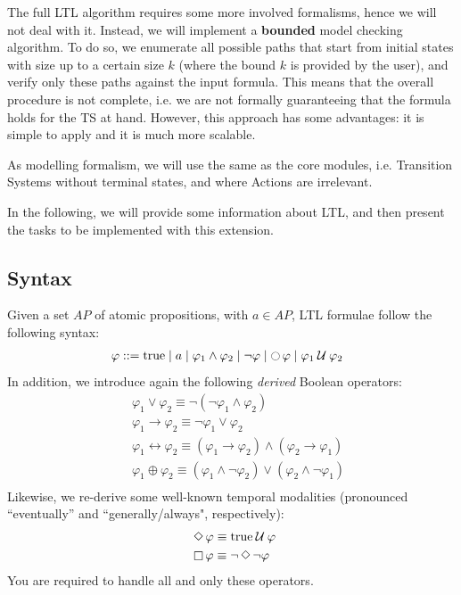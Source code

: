 \documentclass{article}
\begin{document}
The full LTL algorithm requires some more involved formalisms, hence we will not deal with it. Instead, we will implement a \textbf{bounded} model checking algorithm. To do so, we enumerate all possible paths that start from initial states with size up to a certain size $k$ (where the bound $k$ is provided by the user), and verify only these paths against the input formula. This means that the overall procedure is not complete, i.e. we are not formally guaranteeing that the formula holds for the TS at hand. However, this approach has some advantages: it is simple to apply and it is much more scalable. 

As modelling formalism, we will use the same as the core modules, i.e. Transition Systems without terminal states, and where Actions are irrelevant.

In the following, we will provide some information about LTL, and then present the tasks to be implemented with this extension.

\subsection*{Syntax}
Given a set $AP$ of atomic propositions, with $a \in AP$, LTL formulae follow the following syntax: 
\begin{align*}
    &\; \varphi ::= \text{true} \mid a \mid \varphi_1 \land \varphi_2 \mid \neg \varphi \mid \mathop{\ocircle}{\varphi} \mid \varphi_1 \mathbin{\mathcal{U}} \varphi_2
\end{align*}
In addition, we introduce again the following \emph{derived} Boolean operators: 
\begin{align*}
    &\; \varphi_1 \lor \varphi_2 \equiv \neg (\neg \varphi_1 \land \varphi_2) \\
    &\; \varphi_1 \rightarrow \varphi_2 \equiv \neg \varphi_1 \lor \varphi_2 \\
    &\; \varphi_1 \leftrightarrow  \varphi_2 \equiv (\varphi_1 \rightarrow \varphi_2) \land (\varphi_2 \rightarrow \varphi_1) \\
    &\; \varphi_1 \oplus  \varphi_2 \equiv (\varphi_1 \land \neg \varphi_2) \lor (\varphi_2 \land \neg \varphi_1)\\
\end{align*}
Likewise, we re-derive some well-known temporal modalities (pronounced ``eventually'' and ``generally/always", respectively):
\begin{align*}
    &\; \mathop{\Diamond} \varphi \equiv \text{true} \mathbin{\mathcal{U}} \varphi \\
    &\; \mathop{\square} \varphi \equiv \neg \mathop{\Diamond} \neg \varphi \\
\end{align*}
You are required to handle all and only these operators.
\end{document}
